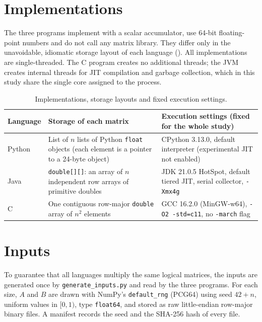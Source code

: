 \documentclass[12pt,a4paper]{report}
\begin{document}
\section{Implementations}

The three programs implement  with a scalar accumulator, use 64-bit floating-point numbers and do not
call any matrix library. They differ only in the unavoidable, idiomatic storage layout of each language
(). All implementations are single-threaded. The C program creates no additional threads; the JVM
creates internal threads for JIT compilation and garbage collection, which in this study share the single core
assigned to the process.

\begin{table}[H]
\centering
\small
\caption{Implementations, storage layouts and fixed execution settings.}
\label{tab:impl}
\begin{tabular}{p{1.4cm}p{6.0cm}p{6.0cm}}
\toprule
\textbf{Language} & \textbf{Storage of each matrix} & \textbf{Execution settings (fixed for the whole study)} \\
\midrule
Python & List of $n$ lists of Python \texttt{float} objects (each element is a pointer to a 24-byte object) & CPython 3.13.0, default interpreter (experimental JIT not enabled) \\
\addlinespace
Java & \texttt{double[][]}: an array of $n$ independent row arrays of primitive doubles & JDK 21.0.5 HotSpot, default tiered JIT, serial collector, \texttt{-Xmx4g} \\
\addlinespace
C & One contiguous row-major \texttt{double} array of $n^2$ elements & GCC 16.2.0 (MinGW-w64), \texttt{-O2 -std=c11}, no \texttt{-march} flag \\
\bottomrule
\end{tabular}
\end{table}

\section{Inputs}

To guarantee that all languages multiply the same logical matrices, the inputs are generated once by
\texttt{generate\_inputs.py} and read by the three programs. For each size, $A$ and $B$ are drawn with NumPy's
\texttt{default\_rng} (PCG64) using seed $42 + n$, uniform values in $[0, 1)$, type \texttt{float64}, and stored as raw
little-endian row-major binary files. A manifest records the seed and the SHA-256 hash of every file.
\end{document}
